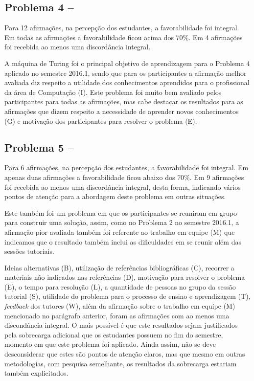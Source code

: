 \subsection{Problema 4 -- \ProblemaD}

Para 12 afirmações, na percepção dos estudantes, a favorabilidade foi integral.
Em todas as afirmações a favorabilidade ficou acima dos $70\%$.
Em 4 afirmações foi recebida ao menos uma discordância integral.

A máquina de Turing foi o principal objetivo de aprendizagem para o Problema 4
aplicado no semestre 2016.1, sendo que para os participantes a afirmação
melhor avaliada diz respeito a utilidade dos conhecimentos aprendidos para 
o profissional da área de Computação (I).
Este problema foi muito bem avaliado pelos participantes para todas
as afirmações, mas cabe destacar os resultados para as afirmações que
dizem respeito a necessidade de aprender novos conhecimentos (G) e
motivação dos participantes para resolver o problema (E).


\subsection{Problema 5 -- \ProblemaE}

Para 6 afirmações, na percepção dos estudantes, a favorabilidade foi integral.
Em apenas duas afirmações a favorabilidade ficou abaixo dos $70\%$.
Em 9 afirmações foi recebida ao menos uma discordância integral, desta forma,
indicando vários pontos de atenção para a abordagem deste problema
em outras situações.

Este também foi um problema em que os participantes se reuniram em grupo para
construir uma solução, assim, como no Problema 2 no semestre 2016.1, a
afirmação pior avaliada também foi referente ao trabalho em equipe (M) que
indicamos que o resultado também inclui as dificuldades em se reunir além
das sessões tutoriais.

Ideias alternativas (B), utilização de referências bibliográficas (C),
recorrer a materiais não indicados nas referências (D), motivação
para resolver o problema (E), o tempo para resolução (L), a quantidade de
pessoas no grupo da sessão tutorial (S), utilidade do problema para o
processo de ensino e aprendizagem (T), \textit{feedback} dos
tutores (W), além da afirmação sobre o trabalho em equipe (M)
mencionado no parágrafo anterior, foram as afirmações com ao menos
uma discondância integral.
O mais possível é que este resultados sejam justificados pela sobrecarga
adicional que os estudantes possuem no fim do semestre, momento em que
este problema foi aplicado.
Ainda assim, não se deve desconsiderar que estes são pontos
de atenção claros, mas que mesmo em outras metodologias, com pesquisa
semelhante, os resultados da sobrecarga estariam também explicitados.

